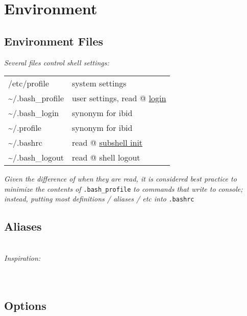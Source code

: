\section{Environment}



\subsection*{Environment Files}


\textit{Several files control shell settings:}\\
\begin{tabular}{l l}
    /etc/profile                    & system settings \\
    \textasciitilde /.bash\_profile & user settings, read @ \ul{login} \\
    \textasciitilde /.bash\_login   & synonym for ibid \\
    \textasciitilde /.profile       & synonym for ibid \\
    \textasciitilde /.bashrc        & read @ \ul{subshell init} \\
    \textasciitilde /.bash\_logout  & read @ shell logout \\
\end{tabular}

\textit{Given the difference of when they are read, it is considered best practice to minimize the contents of }\texttt{.bash\_profile}\textit{ to commands that write to console; instead, putting most definitions / aliases / etc into }\texttt{.bashrc}


\subsection*{Aliases}

\\

\textit{Inspiration:}\\
\\
\\


\subsection*{Options}

